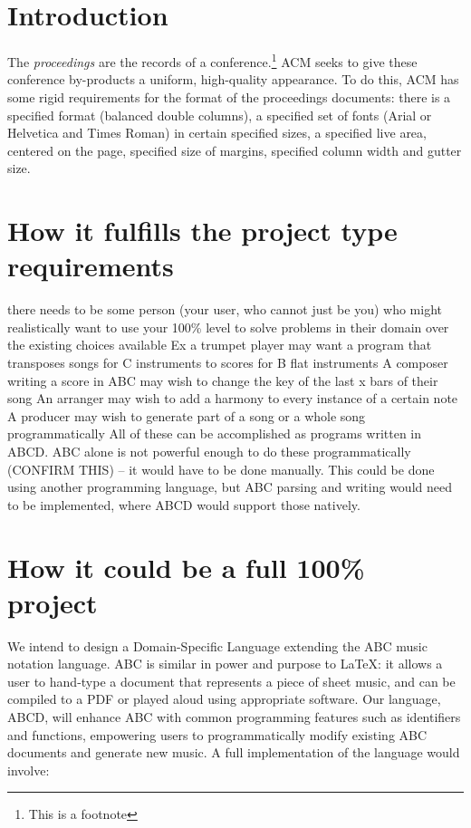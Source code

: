\section{Introduction}

The \textit{proceedings} are the records of a conference.\footnote{This
  is a footnote}  ACM seeks
to give these conference by-products a uniform, high-quality
appearance.  To do this, ACM has some rigid requirements for the
format of the proceedings documents: there is a specified format
(balanced double columns), a specified set of fonts (Arial or
Helvetica and Times Roman) in certain specified sizes, a specified
live area, centered on the page, specified size of margins, specified
column width and gutter size.

\section{How it fulfills the project type requirements}

there needs to be some person (your user, who cannot just be you) who might realistically want to use your 100\% level to solve problems in their domain over the existing choices available
Ex a trumpet player may want a program that transposes songs for C instruments to scores for B flat instruments
A composer writing a score in ABC may wish to change the key of the last x bars of their song
An arranger may wish to add a harmony to every instance of a certain note
A producer may wish to generate part of a song or a whole song programmatically
All of these can be accomplished as programs written in ABCD. ABC alone is not powerful enough to do these programmatically (CONFIRM THIS) -- it would have to be done manually. This could be done using another programming language, but  ABC parsing and writing would need to be implemented, where ABCD would support those natively.

\section{How it could be a full 100\% project}
We intend to design a Domain-Specific Language extending the ABC music notation language. ABC is similar in power and purpose to LaTeX: it allows a user to hand-type a document that represents a piece of sheet music, and can be compiled to a PDF or played aloud using appropriate software. Our language, ABCD, will enhance ABC with common programming features such as identifiers and functions, empowering users to programmatically modify existing ABC documents and generate new music. 
	A full implementation of the language would involve:

